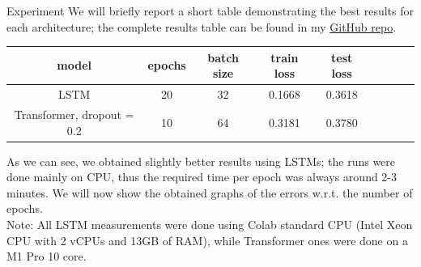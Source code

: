 \documentclass[aspectratio=169,t,xcolor=table]{beamer}
\begin{document}
\begin{frame}[allowframebreaks]{Experiment}
We will briefly report a short table demonstrating the best results for each architecture; the complete results table can be found in my \href{https://github.com/lorenzozanolin/StateEstimation}{GitHub repo}.%
\begin{table}[]
    \begin{tabular}{|c|c|c|c|c|c|c|c|c|}
    \hline
    \textbf{model} & \textbf{epochs} & \textbf{batch size} & \textbf{train loss} & \textbf{test loss} \\ \hline
    LSTM                                  & 20                                     & 32                                         & 0.1668              & 0.3618             \\ \hline
    Transformer, dropout = 0.2            & 10                                     & 64                                         & 0.3181               & 0.3780             \\ \hline
    \end{tabular}
    \end{table}
As we can see, we obtained slightly better results using LSTMs; the runs were done mainly on CPU, thus the required time per epoch was always around 2-3 minutes. We will now show the obtained graphs of the errors w.r.t. the number of epochs.\\
\vspace{2mm}
Note: All LSTM measurements were done using Colab standard CPU (Intel Xeon CPU with 2 vCPUs and 13GB of RAM), while Transformer ones were done on a M1 Pro 10 core.\\


\end{frame}
\end{document}
